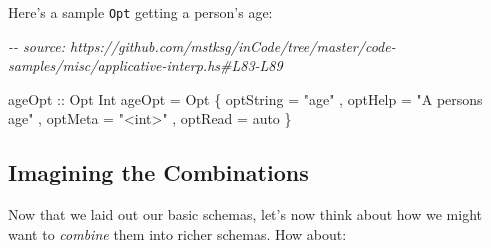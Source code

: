 \documentclass[]{article}
\newenvironment{Shaded}{}{}
\newcommand{\CommentTok}[1]{\textcolor[rgb]{0.38,0.63,0.69}{\textit{#1}}}
\newcommand{\DataTypeTok}[1]{\textcolor[rgb]{0.56,0.13,0.00}{#1}}
\newcommand{\DecValTok}[1]{\textcolor[rgb]{0.25,0.63,0.44}{#1}}
\newcommand{\NormalTok}[1]{#1}
\newcommand{\OperatorTok}[1]{\textcolor[rgb]{0.40,0.40,0.40}{#1}}
\newcommand{\OtherTok}[1]{\textcolor[rgb]{0.00,0.44,0.13}{#1}}
\newcommand{\StringTok}[1]{\textcolor[rgb]{0.25,0.44,0.63}{#1}}
\begin{document}
Here's a sample \texttt{Opt} getting a person's age:

\begin{Shaded}
\begin{Highlighting}[]
\CommentTok{{-}{-} source: https://github.com/mstksg/inCode/tree/master/code{-}samples/misc/applicative{-}interp.hs\#L83{-}L89}

\OtherTok{ageOpt ::} \DataTypeTok{Opt} \DataTypeTok{Int}
\NormalTok{ageOpt }\OtherTok{=} \DataTypeTok{Opt}
\NormalTok{    \{ optString }\OtherTok{=} \StringTok{"age"}
\NormalTok{    , optHelp   }\OtherTok{=} \StringTok{"A person\textquotesingle{}s age"}
\NormalTok{    , optMeta   }\OtherTok{=} \StringTok{"<int>"}
\NormalTok{    , optRead   }\OtherTok{=}\NormalTok{ auto}
\NormalTok{    \}}
\end{Highlighting}
\end{Shaded}

\begin{Shaded}
\end{Shaded}

\hypertarget{imagining-the-combinations}{%
\subsection{Imagining the Combinations}\label{imagining-the-combinations}}

Now that we laid out our basic schemas, let's now think about how we might want
to \emph{combine} them into richer schemas. How about:
\end{document}
